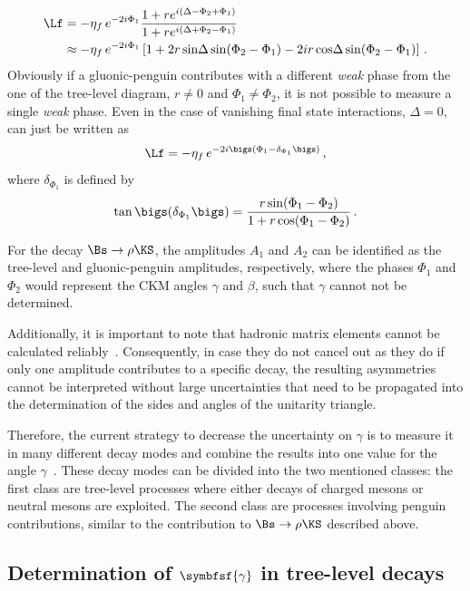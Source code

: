 \begin{align}
\Lf&=-\eta_f\,e^{-2i\Phi_1}\frac{1+re^{i\left(\Delta-\Phi_2+\Phi_1\right)}}{1+re^{i\left(\Delta+\Phi_2-\Phi_1\right)}}\nonumber\\
&\approx-\eta_f\,e^{-2i\Phi_1}\left[1+2r\sin\!\Delta\sin\!\left(\Phi_2-\Phi_1\right)-2ir\cos\!\Delta\sin\!\left(\Phi_2-\Phi_1\right)\right]\,.
\end{align}
Obviously if a gluonic-penguin contributes with a different \emph{weak} phase from the one of the tree-level diagram, \ie $r\neq0$ and $\Phi_1\neq\Phi_2$, it is not possible to measure a single \emph{weak} phase.
Even in the case of vanishing final state interactions, \ie $\Delta=0$, \Lf can just be written as
\begin{equation}
\Lf=-\eta_f\,e^{-2i\bigs(\Phi_1-\delta_{\Phi_1}\bigs)}\,,
\end{equation}
where $\delta_{\Phi_1}$ is defined by
\begin{equation}
\tan\bigs(\delta_{\Phi_1}\bigs)=\frac{r\sin\!\left(\Phi_1-\Phi_2\right)}{1+r\cos\!\left(\Phi_1-\Phi_2\right)}\,.
\end{equation}

For the decay \mbox{$\Bs\to\rho\KS$}, the amplitudes $A_1$ and $A_2$ can be identified as the tree-level and gluonic-penguin amplitudes, respectively, where the phases $\Phi_1$ and $\Phi_2$ would represent the CKM angles $\gamma$ and $\beta$, such that $\gamma$ cannot not be determined.

Additionally, it is important to note that hadronic matrix elements cannot be calculated reliably~\cite{Branco:396964}.
Consequently, in case they do not cancel out as they do if only one amplitude contributes to a specific decay, the resulting \CP asymmetries cannot be interpreted without large uncertainties that need to be propagated into the determination of the sides and angles of the unitarity triangle.

Therefore, the current strategy to decrease the uncertainty on $\gamma$ is to measure it in many different decay modes and combine the results into one value for the angle $\gamma$~\cite{GammCombo}.
These decay modes can be divided into the two mentioned classes: the first class are tree-level processes where either decays of charged \B mesons or neutral \B mesons are exploited.
The second class are processes involving penguin contributions, similar to the contribution to $\Bs\to\rho\KS$ described above.

\subsection[head={Determination of $\gamma$ in tree-level decays},tocentry={Determination of $\gamma$ in tree-level decays}]{Determination of $\symbfsf{\gamma}$ in tree-level decays}
\label{sec:gamamInTrees}

